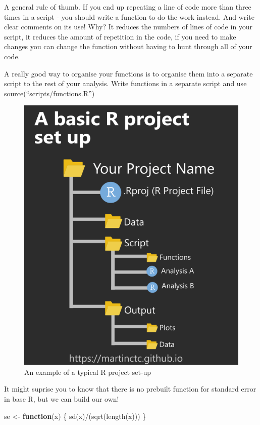 \documentclass[
]{book}
\makeatletter
\newenvironment{Shaded}{\begin{snugshade}}{\end{snugshade}}
\newcommand{\ControlFlowTok}[1]{\textcolor[rgb]{0.13,0.29,0.53}{\textbf{#1}}}
\newcommand{\FunctionTok}[1]{\textcolor[rgb]{0.00,0.00,0.00}{#1}}
\newcommand{\NormalTok}[1]{#1}
\newcommand{\OtherTok}[1]{\textcolor[rgb]{0.56,0.35,0.01}{#1}}
\newcommand{\SpecialCharTok}[1]{\textcolor[rgb]{0.00,0.00,0.00}{#1}}
\newenvironment{kframe}{%
\medskip{}
\setlength{\fboxsep}{.8em}
 \def\at@end@of@kframe{}%
 \ifinner\ifhmode%
  \def\at@end@of@kframe{\end{minipage}}%
  \begin{minipage}{\columnwidth}%
 \fi\fi%
 \def\FrameCommand##1{\hskip\@totalleftmargin \hskip-\fboxsep
 \colorbox{shadecolor}{##1}\hskip-\fboxsep
     \hskip-\linewidth \hskip-\@totalleftmargin \hskip\columnwidth}%
 \MakeFramed {\advance\hsize-\width
   \@totalleftmargin\z@ \linewidth\hsize
   \@setminipage}}%
 {\par\unskip\endMakeFramed%
 \at@end@of@kframe}
\newenvironment{block}[1]
  {
  \begin{itemize}
  \renewcommand{\labelitemi}{
    \raisebox{-.7\height}[0pt][0pt]{
      {\setkeys{Gin}{width=3em,keepaspectratio}\texttt{[image: images/\#1]}}
    }
  }
  \setlength{\fboxsep}{1em}
  \begin{kframe}
  \item
  }
  {
  \end{kframe}
  \end{itemize}
  }
\newenvironment{rmdnote}
  {\begin{block}{note}}
  {\end{block}}
\makeatother
\begin{document}
\begin{rmdnote}
A general rule of thumb. If you end up repeating a line of code more
than three times in a script - you should write a function to do the
work instead. And write clear comments on its use! Why? It reduces the
numbers of lines of code in your script, it reduces the amount of
repetition in the code, if you need to make changes you can change the
function without having to hunt through all of your code.

A really good way to organise your functions is to organise them into a
separate script to the rest of your analysis. Write functions in a
separate script and use source(``scripts/functions.R'')
\end{rmdnote}

\begin{figure}
\includegraphics[width=0.8\linewidth]{images/project} \caption{An example of a typical R project set-up}\label{fig:unnamed-chunk-347}
\end{figure}

It might suprise you to know that there is no prebuilt function for standard error in base R, but we can build our own!

\begin{Shaded}
\begin{Highlighting}[]
\NormalTok{se }\OtherTok{\textless{}{-}} \ControlFlowTok{function}\NormalTok{(x) \{}
  \FunctionTok{sd}\NormalTok{(x)}\SpecialCharTok{/}\NormalTok{(}\FunctionTok{sqrt}\NormalTok{(}\FunctionTok{length}\NormalTok{(x)))}
\NormalTok{  \}}
\end{Highlighting}
\end{Shaded}
\end{document}
